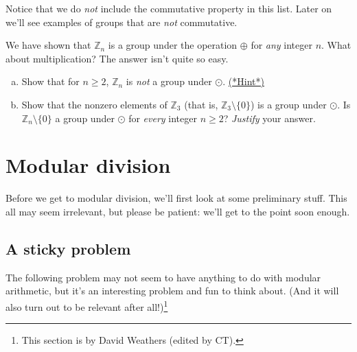 \noindent
Notice that we do  \emph{not} include the commutative property in this list. Later on we'll see examples of groups that are \emph{not} commutative. 

We have shown that  ${\mathbb Z}_n$ is a group under the operation $\oplus$ for \emph{any} integer $n$. What about multiplication? The answer isn't quite so easy.

\begin{exercise}{64}
\begin{enumerate}[(a)]
\item Show that for $n \ge 2$, ${\mathbb Z}_n$ is \emph{not} a group under $\odot$. 
\hyperref[sec:modular_arithmetic:hints]{(*Hint*)}
\item
Show that the nonzero elements of ${\mathbb Z}_3$ (that is, ${\mathbb Z}_3 \setminus \{0\}$)  is a group under $\odot$.
Is ${\mathbb Z}_n \setminus \{0\}$ a group under $\odot$ for \emph{every} integer $n \ge 2$?  \emph{Justify} your answer.
\end{enumerate}
\end{exercise}


 \section{Modular division\quad
{}}\label{euclidean}

 Before we get to modular division, we'll first look at some preliminary stuff. This all may seem irrelevant, but  please be patient: we'll get to the point soon enough.
 
 
\subsection{A sticky problem}
The following problem may not seem to have anything to do with modular arithmetic, but it's an interesting problem and fun to think about. (And it will also turn out to be relevant after all!)\footnote{This section is by David Weathers (edited by CT).}

